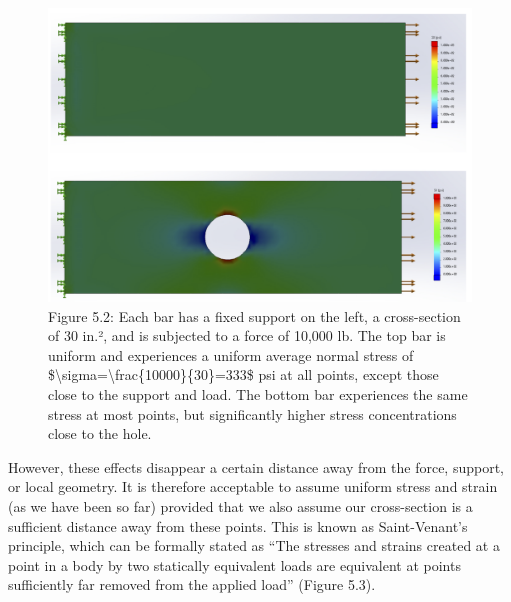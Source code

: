 \documentclass[
  letterpaper,
  DIV=11,
  numbers=noendperiod]{scrreprt}
\theoremstyle{definition}
\theoremstyle{remark}
\begin{document}
\begin{figure}[H]

{\centering \includegraphics[width=5.89583in,height=\textheight]{images/PNGs/Figure 5.2.png}

}

\caption{Figure 5.2: Each bar has a fixed support on the left, a
cross-section of 30 in.², and is subjected to a force of 10,000 lb. The
top bar is uniform and experiences a uniform average normal stress of
\$\textbackslash sigma=\textbackslash frac\{10000\}\{30\}=333\$ psi at
all points, except those close to the support and load. The bottom bar
experiences the same stress at most points, but significantly higher
stress concentrations close to the hole.}

\end{figure}%

However, these effects disappear a certain distance away from the force,
support, or local geometry. It is therefore acceptable to assume uniform
stress and strain (as we have been so far) provided that we also assume
our cross-section is a sufficient distance away from these points. This
is known as Saint-Venant's principle, which can be formally stated as
``The stresses and strains created at a point in a body by two
statically equivalent loads are equivalent at points sufficiently far
removed from the applied load'' (Figure 5.3).
\end{document}
